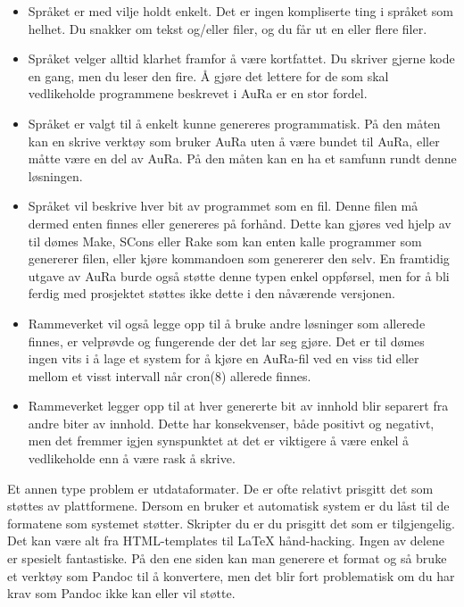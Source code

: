 \documentclass[norsk, 11pt, a4paper]{article}
\begin{document}
\begin{itemize}
\item Språket er med vilje holdt enkelt. Det er ingen kompliserte ting i språket som helhet. Du snakker om tekst og/eller filer, og du får ut en eller flere filer.
\item Språket velger alltid klarhet framfor å være kortfattet. Du skriver gjerne kode en gang, men du leser den fire. Å gjøre det lettere for de som skal vedlikeholde programmene beskrevet i AuRa er en stor fordel.
\item Språket er valgt til å enkelt kunne genereres programmatisk. På den måten kan en skrive verktøy som bruker AuRa uten å være bundet til AuRa, eller måtte være en del av AuRa. På den måten kan en ha et samfunn rundt denne løsningen.
\item Språket vil beskrive hver bit av programmet som en fil. Denne filen må dermed enten finnes eller genereres på forhånd. Dette kan gjøres ved hjelp av til dømes Make, SCons eller Rake som kan enten kalle programmer som genererer filen, eller kjøre kommandoen som genererer den selv. En framtidig utgave av AuRa burde også støtte denne typen enkel oppførsel, men for å bli ferdig med prosjektet støttes ikke dette i den nåværende versjonen.
\item Rammeverket vil også legge opp til å bruke andre løsninger som allerede finnes, er velprøvde og fungerende der det lar seg gjøre. Det er til dømes ingen vits i å lage et system for å kjøre en AuRa-fil ved en viss tid eller mellom et visst intervall når cron(8) allerede finnes.
\item Rammeverket legger opp til at hver genererte bit av innhold blir separert fra andre biter av innhold. Dette har konsekvenser, både positivt og negativt, men det fremmer igjen synspunktet at det er viktigere å være enkel å vedlikeholde enn å være rask å skrive.
\end{itemize}




Et annen type problem er utdataformater. De er ofte relativt prisgitt det som støttes av plattformene. Dersom en bruker et automatisk system er du låst til de formatene som systemet støtter. Skripter du er du prisgitt det som er tilgjengelig. Det kan være alt fra HTML-templates til LaTeX hånd-hacking. Ingen av delene er spesielt fantastiske. På den ene siden kan man generere et format og så bruke et verktøy som Pandoc til å konvertere, men det blir fort problematisk om du har krav som Pandoc ikke kan eller vil støtte.
\end{document}

